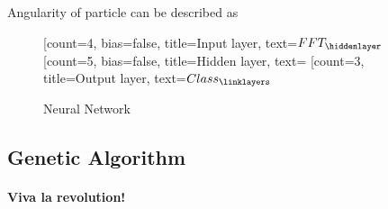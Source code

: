 Angularity of particle can be described as 


\begin{figure}[h, center]
	\begin{center}
		\begin{neuralnetwork}[height=4, nodespacing=40]
				\newcommand{\nodetextclear}[2]{}
				\newcommand{\nodetextx}[2]{$FFT_#2$}
				\newcommand{\nodetexty}[2]{$Class_#2$}
				[count=4, bias=false, title=Input layer, text=\nodetextx]
				\hiddenlayer[count=5, bias=false, title=Hidden layer, text=\nodetextclear] \linklayers
				\outputlayer[count=3, title=Output layer, text=\nodetexty] \linklayers
		\end{neuralnetwork}
	\end{center}
	\caption{Neural Network}
\end{figure}


\subsection{Genetic Algorithm}

\paragraph{Viva la revolution!}